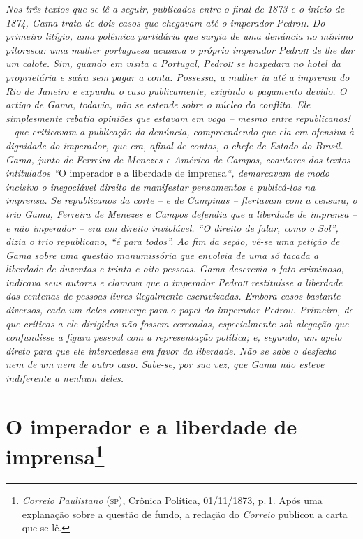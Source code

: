 \begin{argumento}
\emph{Nos três textos que se lê a seguir, publicados entre o final de
1873 e o início de 1874, Gama trata de dois casos que chegavam até o
imperador Pedro\textsc{ii}. Do primeiro litígio, uma polêmica partidária que
surgia de uma denúncia no mínimo pitoresca: uma mulher portuguesa
acusava o próprio imperador Pedro\textsc{ii} de lhe dar um calote. Sim, quando
em visita a Portugal, Pedro\textsc{ii} se hospedara no hotel da proprietária e
saíra sem pagar a conta. Possessa, a mulher ia até a imprensa do Rio de
Janeiro e expunha o caso publicamente, exigindo o pagamento devido. O
artigo de Gama, todavia, não se estende sobre o núcleo do conflito. Ele
simplesmente rebatia opiniões que estavam em voga -- mesmo entre
republicanos! -- que criticavam a publicação da denúncia, compreendendo
que ela era ofensiva à dignidade do imperador, que era, afinal de
contas, o chefe de Estado do Brasil. Gama, junto de Ferreira de Menezes
e Américo de Campos, coautores dos textos intitulados ``}O imperador e a
liberdade de imprensa\emph{``, demarcavam de modo incisivo o inegociável
direito de manifestar pensamentos e publicá-los na imprensa. Se
republicanos da corte -- e de Campinas -- flertavam com a censura, o
trio Gama, Ferreira de Menezes e Campos defendia que a liberdade de
imprensa -- e não imperador -- era um direito inviolável. ``O direito de
falar, como o Sol'', dizia o trio republicano, ``é para todos''. Ao fim da
seção, vê-se uma petição de Gama sobre uma questão manumissória que
envolvia de uma só tacada a liberdade de duzentas e trinta e oito
pessoas. Gama descrevia o fato criminoso, indicava seus autores e
clamava que o imperador Pedro\textsc{ii} restituísse a liberdade das centenas de
pessoas livres ilegalmente escravizadas. Embora casos bastante diversos,
cada um deles converge para o papel do imperador Pedro\textsc{ii}. Primeiro, de
que críticas a ele dirigidas não fossem cerceadas, especialmente sob
alegação que confundisse a figura pessoal com a representação política;
e, segundo, um apelo direto para que ele intercedesse em favor da
liberdade. Não se sabe o desfecho nem de um nem de outro caso. Sabe-se,
por sua vez, que Gama não esteve indiferente a nenhum deles.}
\end{argumento}

\chapter{O imperador e a liberdade de imprensa\footnote{\emph{Correio Paulistano} (\textsc{sp}), Crônica Política,
  01/11/1873, p.\,1. Após uma explanação sobre a questão de fundo, a
  redação do \emph{Correio} publicou a carta que se lê.}} %

